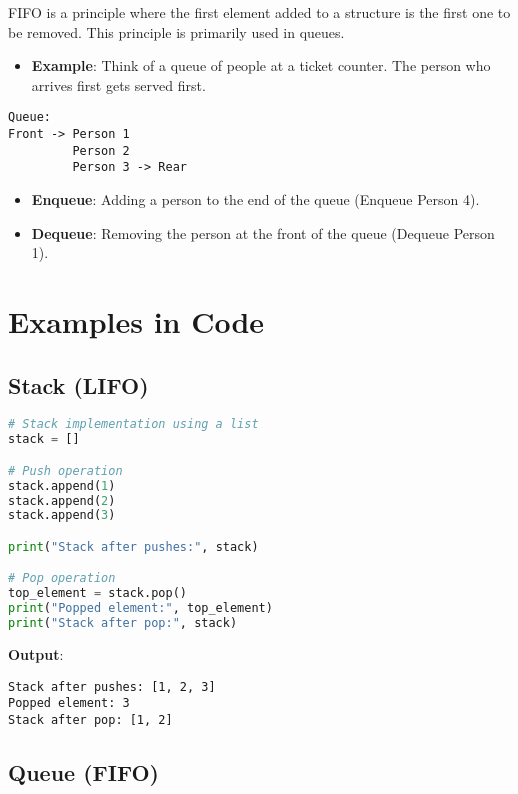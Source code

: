 \documentclass{article}
\begin{document}
FIFO is a principle where the first element added to a structure is the first one to be removed. This principle is primarily used in queues.

\begin{itemize}
    \item \textbf{Example}: Think of a queue of people at a ticket counter. The person who arrives first gets served first.
\end{itemize}

\begin{verbatim}
Queue:
Front -> Person 1
         Person 2
         Person 3 -> Rear
\end{verbatim}

\begin{itemize}
    \item \textbf{Enqueue}: Adding a person to the end of the queue (Enqueue Person 4).
    \item \textbf{Dequeue}: Removing the person at the front of the queue (Dequeue Person 1).
\end{itemize}

\section{Examples in Code}

\subsection{Stack (LIFO)}

\begin{lstlisting}[language=Python, caption=Stack implementation using a list]
# Stack implementation using a list
stack = []

# Push operation
stack.append(1)
stack.append(2)
stack.append(3)

print("Stack after pushes:", stack)

# Pop operation
top_element = stack.pop()
print("Popped element:", top_element)
print("Stack after pop:", stack)
\end{lstlisting}

\textbf{Output}:
\begin{verbatim}
Stack after pushes: [1, 2, 3]
Popped element: 3
Stack after pop: [1, 2]
\end{verbatim}

\subsection{Queue (FIFO)}
\end{document}

